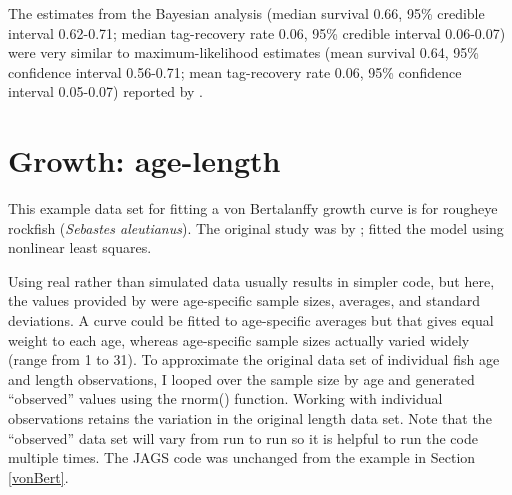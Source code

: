 \documentclass[
]{krantz}
\begin{document}
The estimates from the Bayesian analysis (median survival 0.66, 95\% credible interval 0.62-0.71; median tag-recovery rate 0.06, 95\% credible interval 0.06-0.07) were very similar to maximum-likelihood estimates (mean survival 0.64, 95\% confidence interval 0.56-0.71; mean tag-recovery rate 0.06, 95\% confidence interval 0.05-0.07) reported by \citet{brownie.etal1985}.

\hypertarget{vonBertRealData}{%
\section{Growth: age-length}\label{vonBertRealData}}

This example data set for fitting a von Bertalanffy growth curve is for rougheye rockfish (\emph{Sebastes aleutianus}). The original study was by \citet{nelson.quinnii_1987}; \citet{quinn.deriso_1999} fitted the model using nonlinear least squares.

Using real rather than simulated data usually results in simpler code, but here, the values provided by \citet{quinn.deriso_1999} were age-specific sample sizes, averages, and standard deviations. A curve could be fitted to age-specific averages but that gives equal weight to each age, whereas age-specific sample sizes actually varied widely (range from 1 to 31). To approximate the original data set of individual fish age and length observations, I looped over the sample size by age and generated ``observed'' values using the rnorm() function. Working with individual observations retains the variation in the original length data set. Note that the ``observed'' data set will vary from run to run so it is helpful to run the code multiple times. The JAGS code was unchanged from the example in Section \ref{vonBert}.
\end{document}

